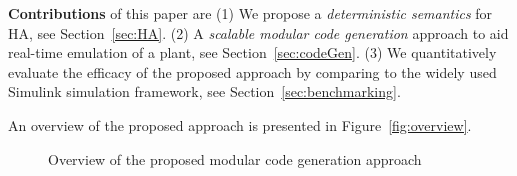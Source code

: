  
 \textbf{Contributions} of this paper are 
 (1) We propose a \emph{deterministic semantics} for \acf{HA}, see Section~\ref{sec:HA}.
 (2) A \emph{scalable modular code generation} approach 
 to aid real-time emulation of a plant, see Section~\ref{sec:codeGen}.
  (3) We quantitatively evaluate the efficacy of the 
  proposed approach by comparing  
   to the widely used Simulink\textsuperscript{\textregistered}
   simulation framework, see Section~\ref{sec:benchmarking}.
   
 An overview of the proposed approach is presented
 in Figure~\ref{fig:overview}.
 
 \begin{figure}[bthp]
 	\centering
 	\scalebox{0.7}{
	 
	}
	 \caption{Overview of the proposed modular code generation approach}
\end{figure}
      
 
 
